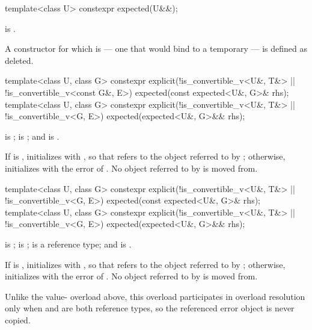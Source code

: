 %
\begin{itemdecl}
template<class U> constexpr expected(U&&);
\end{itemdecl}

\begin{itemdescr}
\pnum
\constraints
{} is .

\pnum
\remarks
A constructor for which  is  — one that would bind  to a temporary — is defined as deleted.
\end{itemdescr}

%
\begin{itemdecl}
template<class U, class G>
constexpr explicit(!is_convertible_v<U&, T&> || !is_convertible_v<const G&, E>)
    expected(const expected<U&, G>& rhs);
template<class U, class G>
constexpr explicit(!is_convertible_v<U&, T&> || !is_convertible_v<G, E>)
    expected(expected<U&, G>&& rhs);
\end{itemdecl}

\begin{itemdescr}
\pnum
\constraints
{} is ;  is ; and  is .

\pnum
\effects
If  is , initializes  with , so that  refers to the object referred to by ; otherwise, initializes  with the error of . No object referred to by  is moved from.
\end{itemdescr}

%
\begin{itemdecl}
template<class U, class G>
constexpr explicit(!is_convertible_v<U&, T&> || !is_convertible_v<G, E>)
    expected(const expected<U&, G>& rhs);
template<class U, class G>
constexpr explicit(!is_convertible_v<U&, T&> || !is_convertible_v<G, E>)
    expected(expected<U&, G>&& rhs);
\end{itemdecl}

\begin{itemdescr}
\pnum
\constraints
{} is ;  is ;  is a reference type; and  is .

\pnum
\effects
If  is , initializes  with , so that  refers to the object referred to by ; otherwise, initializes  with the error of . No object referred to by  is moved from.

\pnum
\remarks
Unlike the value- overload above, this overload participates in overload resolution only when  and  are both reference types, so the referenced error object is never copied.
\end{itemdescr}

